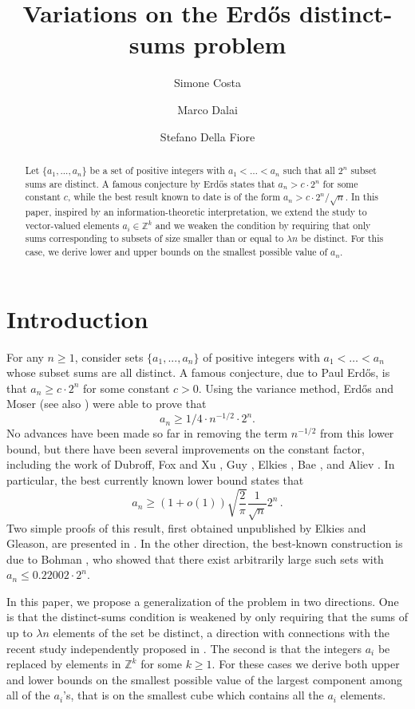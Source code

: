 \documentclass[a4paper]{amsart}
\title{
Variations on the Erd\H{o}s distinct-sums problem
}
\author{Simone Costa}
\author{Marco Dalai}
\author{Stefano Della Fiore}
\theoremstyle{plain}
\begin{document}
\begin{abstract}
Let $\{a_1, . . . , a_n\}$ be a set of positive integers with $a_1 < \dots < a_n$ such that all $2^n$ subset sums are distinct. A famous conjecture by Erd\H{o}s states that $a_n>c\cdot 2^n$ for some constant $c$, while the best result known to date is of the form $a_n>c\cdot 2^n/\sqrt{n}$. In this paper, inspired by an information-theoretic interpretation, we extend the study to vector-valued elements $a_i\in \mathbb{Z}^k$ and we weaken the condition by requiring that only sums corresponding to subsets of size smaller than or equal to $\lambda n$ be distinct. For this case, we derive lower and upper bounds on the smallest possible value of $a_n$.
\end{abstract}


\maketitle

\section{Introduction}
For any $n\geq 1$, consider sets $\{a_1, . . . , a_n\}$ of positive integers with $a_1 < \dots < a_n$ whose subset sums are all distinct. A famous conjecture, due to Paul Erd\H{o}s, is that $a_n \geq c \cdot 2^n$ for some constant $c > 0$. Using the variance method, Erd\H{o}s and Moser \cite{Erdos} (see also \cite{Alon2}) were able to prove that
$$a_n\geq 1/4\cdot n^{-1/2}\cdot 2^n.$$
No advances have been made so far in removing the term $n^{-1/2}$ from this lower bound, but there have been several improvements on the constant factor, including the
work of Dubroff, Fox and Xu \cite{Fox}, Guy \cite{Guy}, Elkies \cite{Elkies}, Bae \cite{Bae}, and Aliev \cite{Aliev}. In particular, the best currently known lower bound states that
$$
a_n\geq (1+o(1))\sqrt{\frac{2}{\pi}} \frac{1}{\sqrt{n}}2^{n}\,.
$$
Two simple proofs of this result, first obtained unpublished by Elkies and Gleason, are presented in \cite{Fox}. In the other direction, the best-known
construction is due to Bohman \cite{Bohman}, who showed that there exist arbitrarily large such sets with $a_n \leq 0.22002 \cdot 2^n$.

In this paper, we propose a generalization of the problem in two directions. One is that the distinct-sums condition is weakened by only requiring that the sums of up to $\lambda n$ elements of the set be distinct, a direction with connections with the recent study independently proposed in \cite{MYR}. The second is that the integers $a_i$ be replaced by elements in $\mathbb{Z}^k$ for some $k\geq 1$. For these cases we derive both upper and lower bounds on the smallest possible value of the largest component among all of the $a_i$'s, that is on the smallest cube which contains all the $a_i$ elements.
\end{document}
